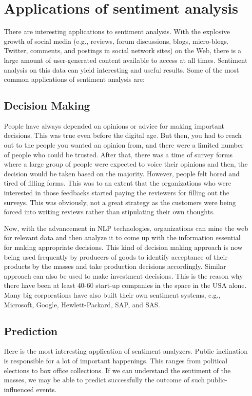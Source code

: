 \section{Applications of sentiment analysis}

There are interesting applications to sentiment analysis. With the explosive growth of social media (e.g., reviews, forum discussions,
blogs, micro-blogs, Twitter, comments, and postings in social network sites)
on the Web, there is a large amount of user-generated content available to access at all times. Sentiment analysis on this data can yield interesting and useful results. Some 
of the most common applications of sentiment analysis are:


\subsection{Decision Making} 
People have always depended on opinions or advice for making important decisions. This was true even before the digital age. 
But then, you had to reach out to the people you wanted an opinion from, and there were a limited number of people who could be trusted. After that, there was a time of
survey forms where a large group of people were expected to voice their opinions and then, the decision would be taken based on the majority. However, people felt bored
and tired of filling forms. This was to an extent that the organizations who were interested in those feedbacks started paying the reviewers for filling out the surveys.
This was obviously, not a great strategy as the customers were being forced into writing reviews rather than stipulating their own thoughts.

\vspace{8mm}

Now, with the advancement in NLP technologies, organizations can mine the web for relevant data and then analyze it to come up with the information essential for making 
appropriate decisions. This kind of decision making approach is now being used frequently by producers of goods to identify acceptance of their products by the masses
and take production decisions accordingly. Similar approach can also be used to make investment decisions. This is the reason why there have been at least 40-60 start-up
companies in the space in the USA alone. Many big corporations have also built their own sentiment systems, e.g., Microsoft, Google, Hewlett-Packard, SAP, and SAS.

\subsection{Prediction}
Here is the most interesting application of sentiment analyzers. Public inclination is responsible for a lot of important happenings.
This ranges from political elections to box office collections. If we can understand the sentiment of the masses, we may be able to predict successfully the outcome
of such public-influenced events.

